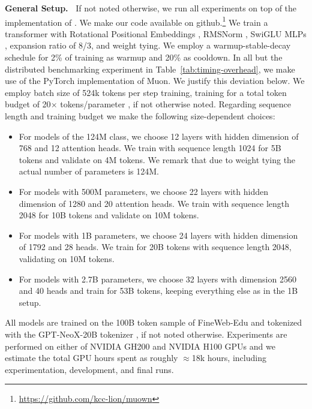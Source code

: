 \textbf{General Setup.\ } If not noted otherwise, we run all experiments on top of the implementation of \cite{ajroldi2024plainlm}. We make our code available on github.\footnote{\url{https://github.com/kcc-lion/muown}} We train a transformer with Rotational Positional Embeddings \citep{su_rope}, RMSNorm \citep{zhang_rmsnorm}, SwiGLU MLPs \citep{shazeer_glu_2020}, expansion ratio of 8/3, and weight tying. We employ a warmup-stable-decay schedule for 2\% of training as warmup and 20\% as cooldown. In all but the distributed benchmarking experiment in Table~\ref{tab:timing-overhead}, we make use of the PyTorch implementation of Muon. We justify this deviation below. We employ batch size of 524k tokens per step training, training for a total token budget of 20$\times$ tokens/parameter \citep{hoffmann_training_2022}, if not otherwise noted. Regarding sequence length and training budget we make the following size-dependent choices:
\begin{itemize}
    \item For models of the 124M class, we choose 12 layers with hidden dimension of 768 and 12 attention heads. We train with sequence length 1024 for 5B tokens and validate on 4M tokens. We remark that due to weight tying the actual number of parameters is 124M.
    \item For models with 500M parameters, we choose 22 layers with hidden dimension of 1280 and 20 attention heads. We train with sequence length 2048 for 10B tokens and validate on 10M tokens. 
    \item For models with 1B parameters, we choose 24 layers with hidden dimension of 1792 and 28 heads. We train for 20B tokens with sequence length 2048, validating on 10M tokens. 
    \item For models with 2.7B parameters, we choose 32 layers with dimension 2560 and 40 heads and train for 53B tokens, keeping everything else as in the 1B setup. 
\end{itemize}

All models are trained on the 100B token sample of FineWeb-Edu \citep{lozhkov2024fineweb-edu} and tokenized with the GPT-NeoX-20B tokenizer \citep{black_gpt-neox-20b_2022}, if not noted otherwise. Experiments are performed on either of NVIDIA GH200 and NVIDIA H100 GPUs and we estimate the total GPU hours spent as roughly $\approx$18k hours, including experimentation, development, and final runs.


